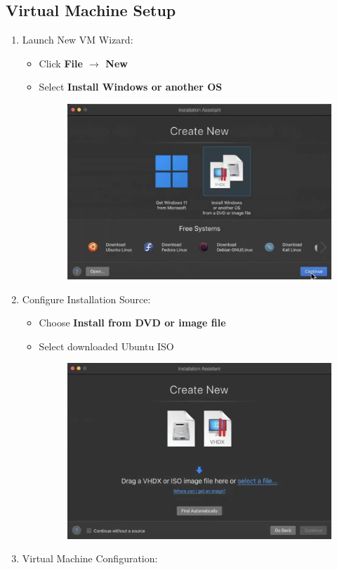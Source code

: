 \documentclass[11pt,a4paper]{article}
\begin{document}
\subsection{Virtual Machine Setup}
\begin{enumerate}
    \item Launch New VM Wizard:
    \begin{itemize}
        \item Click \textbf{File $\rightarrow$ New}
        \item Select \textbf{Install Windows or another OS}
        \begin{figure}[htp]
            \centering
            \includegraphics[width=0.6\linewidth]{images/step11.png}
        \end{figure}
    \end{itemize}
    \item Configure Installation Source:
    \begin{itemize}
        \item Choose \textbf{Install from DVD or image file}
        \item Select downloaded Ubuntu ISO
        \begin{figure}[htp]
            \centering
            \includegraphics[width=0.6\linewidth]{images/step12.png}
        \end{figure}
    \end{itemize}
    \item Virtual Machine Configuration:

\end{enumerate}
\end{document}
